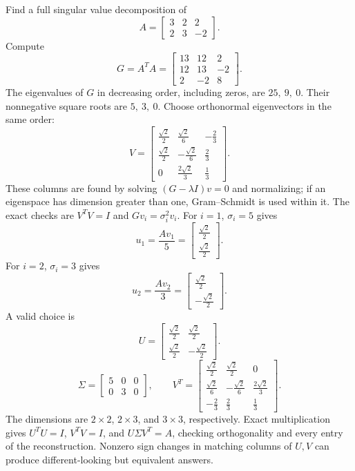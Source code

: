 \goal Find a full singular value decomposition of
\[A=\begin{bmatrix}3&2&2\\2&3&-2\end{bmatrix}.\]
Compute
\[G=A^TA=\begin{bmatrix}13&12&2\\12&13&-2\\2&-2&8\end{bmatrix}.\]
The eigenvalues of $G$ in decreasing order, including zeros, are $25,\ 9,\ 0$. Their nonnegative square roots are $5,\ 3,\ 0$. Choose orthonormal eigenvectors in the same order:
\[V=\begin{bmatrix}\frac{\sqrt{2}}{2}&\frac{\sqrt{2}}{6}&- \frac{2}{3}\\\frac{\sqrt{2}}{2}&- \frac{\sqrt{2}}{6}&\frac{2}{3}\\0&\frac{2 \sqrt{2}}{3}&\frac{1}{3}\end{bmatrix}.\]
These columns are found by solving $(G-\lambda I)v=0$ and normalizing; if an eigenspace has dimension greater than one, Gram--Schmidt is used within it. The exact checks are $V^TV=I$ and $Gv_i=\sigma_i^2v_i$.
For $i=1$, $\sigma_i=5$ gives
\[u_{1}=\frac{Av_{1}}{5}=\begin{bmatrix}\frac{\sqrt{2}}{2}\\\frac{\sqrt{2}}{2}\end{bmatrix}.\]
For $i=2$, $\sigma_i=3$ gives
\[u_{2}=\frac{Av_{2}}{3}=\begin{bmatrix}\frac{\sqrt{2}}{2}\\- \frac{\sqrt{2}}{2}\end{bmatrix}.\]
A valid choice is
\[U=\begin{bmatrix}\frac{\sqrt{2}}{2}&\frac{\sqrt{2}}{2}\\\frac{\sqrt{2}}{2}&- \frac{\sqrt{2}}{2}\end{bmatrix}.\]
\[\Sigma=\begin{bmatrix}5&0&0\\0&3&0\end{bmatrix},\qquad V^T=\begin{bmatrix}\frac{\sqrt{2}}{2}&\frac{\sqrt{2}}{2}&0\\\frac{\sqrt{2}}{6}&- \frac{\sqrt{2}}{6}&\frac{2 \sqrt{2}}{3}\\- \frac{2}{3}&\frac{2}{3}&\frac{1}{3}\end{bmatrix}.\]
The dimensions are $2\times2$, $2\times3$, and $3\times3$, respectively. Exact multiplication gives $U^TU=I$, $V^TV=I$, and $U\Sigma V^T=A$, checking orthogonality and every entry of the reconstruction. Nonzero sign changes in matching columns of $U,V$ can produce different-looking but equivalent answers.


